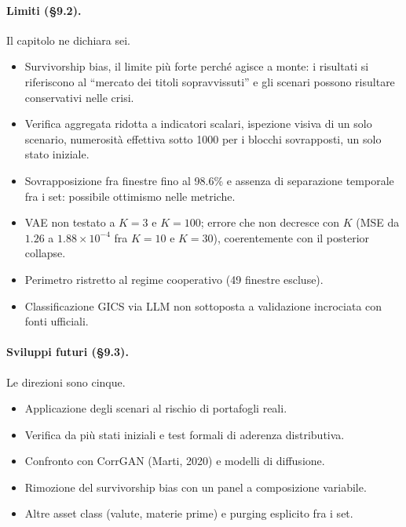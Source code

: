 \paragraph{Limiti (\S9.2).} Il capitolo ne dichiara sei.
\begin{itemize}[nosep]
\item Survivorship bias, il limite più forte perché agisce a monte: i risultati si riferiscono al ``mercato dei titoli sopravvissuti'' e gli scenari possono risultare conservativi nelle crisi.
\item Verifica aggregata ridotta a indicatori scalari, ispezione visiva di un solo scenario, numerosità effettiva sotto 1000 per i blocchi sovrapposti, un solo stato iniziale.
\item Sovrapposizione fra finestre fino al 98.6\% e assenza di separazione temporale fra i set: possibile ottimismo nelle metriche.
\item VAE non testato a $K = 3$ e $K = 100$; errore che non decresce con $K$ (MSE da $1.26$ a $1.88 \times 10^{-4}$ fra $K = 10$ e $K = 30$), coerentemente con il posterior collapse.
\item Perimetro ristretto al regime cooperativo (49 finestre escluse).
\item Classificazione GICS via LLM non sottoposta a validazione incrociata con fonti ufficiali.
\end{itemize}

\paragraph{Sviluppi futuri (\S9.3).} Le direzioni sono cinque.
\begin{itemize}[nosep]
\item Applicazione degli scenari al rischio di portafogli reali.
\item Verifica da più stati iniziali e test formali di aderenza distributiva.
\item Confronto con CorrGAN (Marti, 2020) e modelli di diffusione.
\item Rimozione del survivorship bias con un panel a composizione variabile.
\item Altre asset class (valute, materie prime) e purging esplicito fra i set.
\end{itemize}
